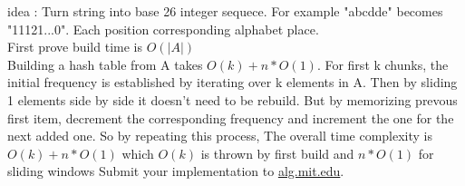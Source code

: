 \documentclass[12pt,twoside]{article}
\begin{document}


\begin{problems}

\problem  %

\begin{problemparts}
\problempart %
\problempart %
\end{problemparts}

\newpage

\problem  %

\begin{problemparts}
\problempart %
\problempart %
\problempart %
\end{problemparts}

\newpage

\problem  %

\begin{problemparts}
\problempart %
\problempart %
\problempart %
\problempart %
\end{problemparts}

\newpage

\problem  %

\begin{problemparts}
\problempart %
\problempart %
\end{problemparts}

\newpage

\problem  %

\begin{problemparts}
\problempart idea : Turn string into base 26 integer sequece. For example "abcdde" becomes "11121...0". Each position corresponding alphabet place.\\
 First prove build time is $O(|A| )$ \\
 Building a hash table from A takes $O(k)+n*O(1)$. For first k chunks, the initial frequency is established by iterating over k elements in A. Then by sliding 1 elements side by side it doesn't need to be rebuild. But by memorizing prevous first item, decrement the corresponding frequency and increment the one for the next added one. So by repeating this process, The overall time complexity is $O(k)+n*O(1)$ which $O(k)$ is thrown by first build and $n*O(1)$ for sliding windows
\problempart %
\problempart Submit your implementation to {\small\url{alg.mit.edu}}.
\end{problemparts}

\end{problems}
\end{document}
